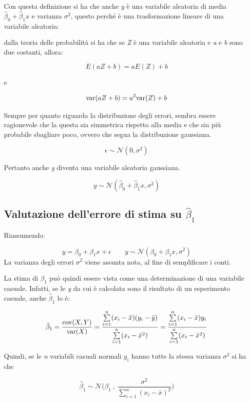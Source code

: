 Con questa definizione si ha che anche \emph{y} è una variabile aleatoria di media $\hat{\beta}_0 + \hat{\beta}_1x$ e varianza $\sigma^2$, questo
perché è una trasformazione lineare di una variabile aleatoria:

dalla teoria delle probabilità si ha che se \textit{Z} è una variabile aleatoria e \textit{a} e \textit{b} sono due costanti, allora:

$$
E(aZ+b) = aE(Z) + b
$$ 

e

$$
\text{var}(aZ+b) = a^2\text{var}(Z)+b
$$

Sempre per quanto riguarda la distribuzione degli errori, sembra essere
ragionevole che la questa sia simmetrica rispetto alla media e che sia più probabile
sbagliare poco, ovvero che segua la distribuzione gaussiana.

$$
\epsilon \sim \mathcal{N}(0,\sigma^2)
$$

Pertanto anche \textit{y} diventa una variabile aleatoria gaussiana.

$$
y \sim \mathcal{N}(\hat{\beta}_0 + \hat{\beta}_1 x, \sigma^2)
$$



\subsection{Valutazione dell'errore di stima su $\hat{\beta}_1$}

Riassumendo:

$$
y = \beta_0 + \beta_1 x + \epsilon \qquad y \sim \mathcal{N}(\beta_0 + \beta_1 x, \sigma^2)
$$
La varianza degli errori $\sigma^2$ viene assunta nota, al fine di semplificare i conti.

La stima di $ \beta_1 $ può quindi essere vista come una determinazione di una variabile casuale. Infatti, se le \textit{y} da cui è calcolata sono il risultato di un esperimento casuale, anche $ \hat{\beta}_1 $ lo è:

$$
\hat{\beta}_1 = \frac{\text{cov}(X,Y)}{\text{var}(X)} = \frac{\sum\limits_{i=1}^n (x_i - \hat{x})(y_i - \bar{y})}{\sum\limits_{i=1}^n (x_i - \bar{x}^2)} = \frac{\sum\limits_{i=1}^n (x_i - \bar{x})y_i}{\sum\limits_{i=1}^n (x_i - \bar{x}^2)} 
$$

Quindi, se le \textit{n} variabili casuali normali $ y_i $ hanno tutte la stessa varianza $ \sigma^2 $ si ha che

$$
\hat{\beta}_1 \sim \mathcal{N}\Bigg(\beta_1 \: , \: \frac{\sigma^2}{\sum_{i=1}^n (x_i - \bar{x})^2}\Bigg)
$$

